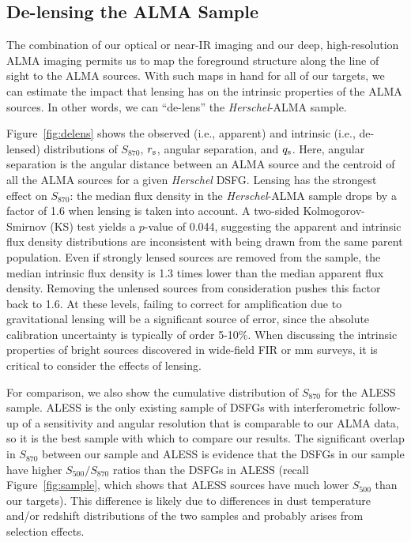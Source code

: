 \documentclass[iop]{emulateapj}
\begin{document}
\subsection{De-lensing the ALMA Sample}\label{sec:lensing}

The combination of our optical or near-IR imaging and our deep, high-resolution
ALMA imaging permits us to map the foreground structure along the line of sight
to the ALMA sources.  With such maps in hand for all of our targets, we can
estimate the impact that lensing has on the intrinsic properties of the ALMA
sources.  In other words, we can ``de-lens'' the {\it Herschel}-ALMA sample.

Figure~\ref{fig:delens} shows the observed (i.e., apparent) and intrinsic
(i.e., de-lensed) distributions of $S_{870}$, $r_{\rm s}$, angular separation,
and $q_{\rm s}$.  Here, angular separation is the angular distance between an
ALMA source and the centroid of all the ALMA sources for a given {\it Herschel}
DSFG.  Lensing has the strongest effect on $S_{870}$: the median flux density
in the {\it Herschel}-ALMA sample drops by a factor of 1.6 when lensing is
taken into account. A two-sided Kolmogorov-Smirnov (KS) test yields a $p$-value
of 0.044, suggesting the apparent and intrinsic flux density distributions are
inconsistent with being drawn from the same parent population.  Even if
strongly lensed sources are removed from the sample, the median intrinsic flux
density is 1.3 times lower than the median apparent flux density.  Removing the
unlensed sources from consideration pushes this factor back to 1.6.  At these
levels, failing to correct for amplification due to gravitational lensing will
be a significant source of error, since the absolute calibration uncertainty is
typically of order 5-10\%.  When discussing the intrinsic properties of bright
sources \citep[including their luminosity functions, e.g.][]{Wyithe:2011rm}
discovered in wide-field FIR or mm surveys, it is critical to consider the
effects of lensing.

For comparison, we also show the cumulative distribution of $S_{870}$ for the
ALESS sample.  ALESS is the only existing sample of DSFGs with interferometric
follow-up of a sensitivity and angular resolution that is comparable to our
ALMA data, so it is the best sample with which to compare our results.  The
significant overlap in $S_{870}$ between our sample and ALESS is evidence that
the DSFGs in our sample have higher $S_{500}/S_{870}$ ratios than the DSFGs in
ALESS (recall Figure~\ref{fig:sample}, which shows that ALESS sources have much
lower $S_{500}$ than our targets).  This difference is likely due to
differences in dust temperature and/or redshift distributions of the two
samples and probably arises from selection effects.
\end{document}
